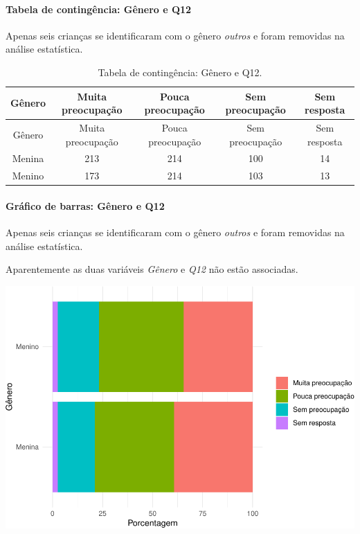 \documentclass[]{article}
\let\oldparagraph\paragraph
\renewcommand{\paragraph}[1]{\oldparagraph{#1}\mbox{}}
\begin{document}
\cleardoublepage

\hypertarget{tabela-de-continguxeancia-guxeanero-e-q12}{%
\paragraph{Tabela de contingência: Gênero e Q12}\label{tabela-de-continguxeancia-guxeanero-e-q12}}

Apenas seis crianças se identificaram com o gênero \emph{outros} e foram removidas na análise estatística.

\begin{longtable}[]{@{}ccccc@{}}
\caption{\label{tab:unnamed-chunk-24}Tabela de contingência: Gênero e Q12.}\tabularnewline
\toprule
Gênero & Muita preocupação & Pouca preocupação & Sem preocupação & Sem resposta\tabularnewline
\midrule
\endfirsthead
\toprule
Gênero & Muita preocupação & Pouca preocupação & Sem preocupação & Sem resposta\tabularnewline
\midrule
\endhead
Menina & 213 & 214 & 100 & 14\tabularnewline
Menino & 173 & 214 & 103 & 13\tabularnewline
\bottomrule
\end{longtable}

\hypertarget{gruxe1fico-de-barras-guxeanero-e-q12}{%
\paragraph{Gráfico de barras: Gênero e Q12}\label{gruxe1fico-de-barras-guxeanero-e-q12}}

Apenas seis crianças se identificaram com o gênero \emph{outros} e foram removidas na análise estatística.

Aparentemente as duas variáveis \emph{Gênero} e \emph{Q12} não estão associadas.

\begin{center}\includegraphics[width=0.75\linewidth]{relatorio_files/figure-latex/unnamed-chunk-25-1} \end{center}
\end{document}
